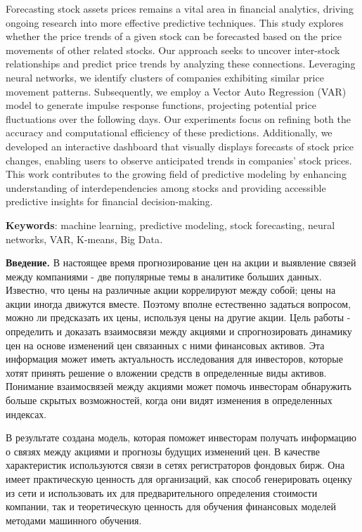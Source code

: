 \documentclass[
]{article}
\begin{document}
Forecasting stock assets prices remains a vital area in financial
analytics, driving ongoing research into more effective predictive
techniques. This study explores whether the price trends of a given
stock can be forecasted based on the price movements of other related
stocks. Our approach seeks to uncover inter-stock relationships and
predict price trends by analyzing these connections. Leveraging neural
networks, we identify clusters of companies exhibiting similar price
movement patterns. Subsequently, we employ a Vector Auto Regression
(VAR) model to generate impulse response functions, projecting potential
price fluctuations over the following days. Our experiments focus on
refining both the accuracy and computational efficiency of these
predictions. Additionally, we developed an interactive dashboard that
visually displays forecasts of stock price changes, enabling users to
observe anticipated trends in companies' stock prices. This work
contributes to the growing field of predictive modeling by enhancing
understanding of interdependencies among stocks and providing accessible
predictive insights for financial decision-making.

\textbf{Keywords}: machine learning, predictive modeling, stock
forecasting, neural networks, VAR, K-means, Big Data\emph{.}

\textbf{Введение.} В настоящее время прогнозирование цен на акции и
выявление связей между компаниями - две популярные темы в аналитике
больших данных. Известно, что цены на различные акции коррелируют между
собой; цены на акции иногда движутся вместе. Поэтому вполне естественно
задаться вопросом, можно ли предсказать их цены, используя цены на
другие акции. Цель работы - определить и доказать взаимосвязи между
акциями и спрогнозировать динамику цен на основе изменений цен связанных
с ними финансовых активов. Эта информация может иметь актуальность
исследования для инвесторов, которые хотят принять решение о вложении
средств в определенные виды активов. Понимание взаимосвязей между
акциями может помочь инвесторам обнаружить больше скрытых возможностей,
когда они видят изменения в определенных индексах.

В результате создана модель, которая поможет инвесторам получать
информацию о связях между акциями и прогнозы будущих изменений цен. В
качестве характеристик используются связи в сетях регистраторов фондовых
бирж. Она имеет практическую ценность для организаций, как способ
генерировать оценку из сети и использовать их для предварительного
определения стоимости компании, так и теоретическую ценность для
обучения финансовых моделей методами машинного обучения.
\end{document}
